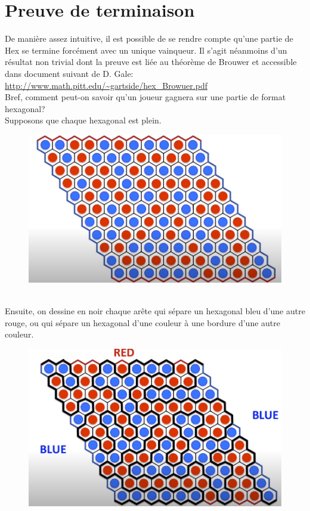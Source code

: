 \documentclass{article}
\begin{document}
\section{Preuve de terminaison}
De manière assez intuitive, il est possible de se rendre compte qu'une partie de Hex se termine forcément avec un unique vainqueur. Il s'agit néanmoins d'un résultat non trivial dont la preuve est liée au théorème de Brouwer et accessible dans document suivant de D. Gale:
\url{http://www.math.pitt.edu/~gartside/hex_Browuer.pdf}
\\
Bref, comment peut-on savoir qu'un joueur gagnera sur une partie de format hexagonal?\\
Supposons que chaque hexagonal est plein.\\
\begin{figure}[ht]
    \centering
    \includegraphics[scale=0.5]{hexplein.png}
    \label{fig:hexplein}
\end{figure}
\\
Ensuite, on dessine en noir chaque arête qui sépare un hexagonal bleu d'une autre rouge, ou qui sépare un hexagonal d'une couleur à une bordure d'une autre couleur.\\
\begin{figure}[ht]
    \centering
    \includegraphics[scale=0.5]{chaines.png}
    \label{fig:chaines}
\end{figure}
\end{document}
